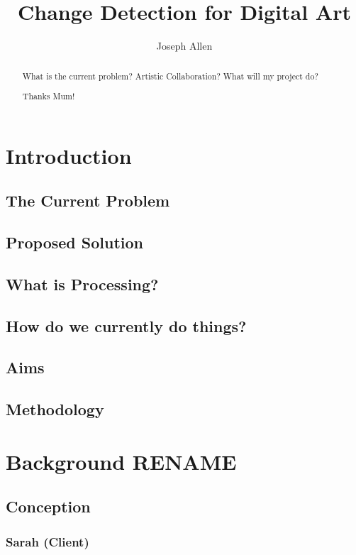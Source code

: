 \documentclass[a4paper]{report}
\title{Change Detection for Digital Art}
\author{Joseph Allen}
\begin{document}
\maketitle

\begin{abstract}
What is the current problem?
Artistic Collaboration?
What will my project do?
\end{abstract}

\renewcommand{\abstractname}{Acknowledgements}
\begin{abstract}
 Thanks Mum!
\end{abstract}

\tableofcontents

\section{Introduction}
\subsection{The Current Problem}
\subsection{Proposed Solution}
\subsection{What is Processing?}
\subsection{How do we currently do things?}
\subsection{Aims}
\subsection{Methodology}

\section{Background RENAME}
\subsection{Conception}
\subsubsection{Sarah (Client)}
\end{document}
